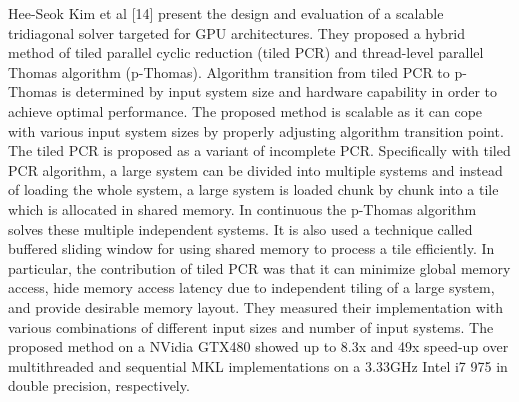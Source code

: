 Hee-Seok Kim et al [14] present the design and evaluation of a scalable tridiagonal solver targeted for GPU architectures. They proposed a hybrid method of tiled parallel cyclic reduction (tiled PCR) and thread-level parallel Thomas algorithm (p-Thomas). Algorithm transition from tiled PCR to p-Thomas is determined by input system size and hardware capability in order to achieve optimal performance. The proposed method is scalable as it can cope with various input system sizes by properly adjusting algorithm transition point. The tiled PCR is proposed as a variant of incomplete PCR. Specifically with tiled PCR algorithm, a large system can be divided into multiple systems and instead of loading the whole system, a large system is loaded chunk by chunk into a tile which is allocated in shared memory. In continuous the p-Thomas algorithm solves these multiple independent systems. It is also used a technique called buffered sliding window for using shared memory to process a tile efficiently. In particular, the contribution of tiled PCR was that it can minimize global memory access, hide memory access latency due to independent tiling of a large system, and provide desirable memory layout. They measured their implementation with various combinations of different input sizes and number of input systems. The proposed method on a NVidia GTX480 showed up to 8.3x and 49x speed-up over multithreaded and sequential MKL implementations on a 3.33GHz Intel i7 975 in double precision, respectively.


